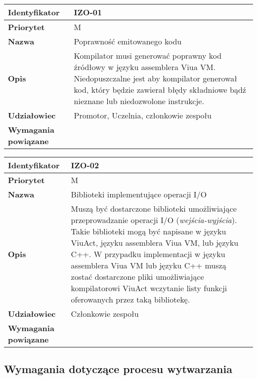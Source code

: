 \vspace{1em}

\begin{tabular}{ | l | l | }
    \hline
    \textbf{Identyfikator} & \parbox[t]{11cm}{IZO-01} \\
    \hline
    \textbf{Priorytet} & M \\
    \hline
    \textbf{Nazwa} & Poprawność emitowanego kodu \\
    \hline
    \textbf{Opis} & \parbox[t]{11cm}{
        Kompilator musi generować poprawny kod źródłowy w języku assemblera Viua VM.
        Niedopuszczalne jest aby kompilator generował kod, który będzie zawierał błędy składniowe bądź
        nieznane lub niedozwolone instrukcje.
    } \\
    \hline
    \textbf{Udziałowiec} & Promotor, Uczelnia, członkowie zespołu \\
    \hline
    \textbf{Wymagania powiązane} & \phantom{} \\
    \hline
\end{tabular}

\vspace{1em}

\begin{tabular}{ | l | l | }
    \hline
    \textbf{Identyfikator} & \parbox[t]{11cm}{IZO-02} \\
    \hline
    \textbf{Priorytet} & M \\
    \hline
    \textbf{Nazwa} & Biblioteki implementujące operacji I/O \\
    \hline
    \textbf{Opis} & \parbox[t]{11cm}{
        Muszą być dostarczone biblioteki umożliwiające przeprowadzanie operacji I/O (\emph{wejścia-wyjścia}).
        Takie biblioteki mogą być napisane w języku ViuAct, języku assemblera Viua VM, lub języku C++.
        W przypadku implementacji w języku assemblera Viua VM lub języku C++ muszą zostać dostarczone pliki
        umożliwiające kompilatorowi ViuAct wczytanie listy funkcji oferowanych przez taką bibliotekę.
    } \\
    \hline
    \textbf{Udziałowiec} & Członkowie zespołu \\
    \hline
    \textbf{Wymagania powiązane} & \phantom{} \\
    \hline
\end{tabular}

\subsection{Wymagania dotyczące procesu wytwarzania}

